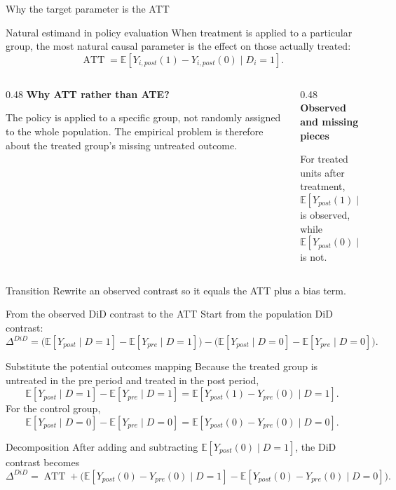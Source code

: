 \documentclass[10pt]{beamer}
\newcommand{\E}{\mathbb{E}}
\newcommand{\ATT}{\operatorname{ATT}}
\begin{document}
\begin{frame}{Why the target parameter is the ATT}
\label{slide:did_att_target}
\small
\begin{block}{Natural estimand in policy evaluation}
When treatment is applied to a particular group, the most natural causal parameter is the effect on those actually treated:
\[
\ATT
=
\E\!\left[Y_{i,post}(1)-Y_{i,post}(0)\mid D_i=1\right].
\]
\end{block}

\begin{columns}[T]
\begin{column}{0.48\textwidth}
\textbf{Why ATT rather than ATE?}

The policy is applied to a specific group, not randomly assigned to the whole population. The empirical problem is therefore about the treated group's missing untreated outcome.
\end{column}
\begin{column}{0.48\textwidth}
\textbf{Observed and missing pieces}

For treated units after treatment,
\[
\E[Y_{post}(1)\mid D=1]
\]
is observed, while
\[
\E[Y_{post}(0)\mid D=1]
\]
is not.
\end{column}
\end{columns}

\medskip
\begin{alertblock}{Transition}
Rewrite an observed contrast so it equals the ATT plus a bias term.
\end{alertblock}
\end{frame}

\begin{frame}{From the observed DiD contrast to the ATT}
\label{slide:did_att_bridge}
\small
Start from the population DiD contrast:
\[
\Delta^{DiD}
=
\Big(\E[Y_{post}\mid D=1]-\E[Y_{pre}\mid D=1]\Big)
-\Big(\E[Y_{post}\mid D=0]-\E[Y_{pre}\mid D=0]\Big).
\]

\begin{block}{Substitute the potential outcomes mapping}
Because the treated group is untreated in the pre period and treated in the post period,
\[
\E[Y_{post}\mid D=1]-\E[Y_{pre}\mid D=1]
=
\E[Y_{post}(1)-Y_{pre}(0)\mid D=1].
\]
For the control group,
\[
\E[Y_{post}\mid D=0]-\E[Y_{pre}\mid D=0]
=
\E[Y_{post}(0)-Y_{pre}(0)\mid D=0].
\]
\end{block}

\begin{exampleblock}{Decomposition}
After adding and subtracting $\E[Y_{post}(0)\mid D=1]$, the DiD contrast becomes
\[
\Delta^{DiD}
=
\ATT
+\Big(
\E[Y_{post}(0)-Y_{pre}(0)\mid D=1]
-\E[Y_{post}(0)-Y_{pre}(0)\mid D=0]
\Big).
\]
\end{exampleblock}

\hfill\hyperlink{app:did-att}{}
\end{frame}
\end{document}
